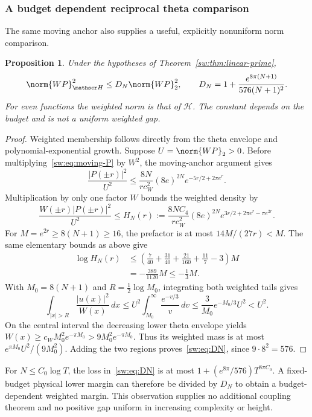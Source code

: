\documentclass[11pt,a4paper]{article}
\numberwithin{equation}{section}
\newtheorem{proposition}[theorem]{Proposition}
\theoremstyle{definition}\newtheorem{definition}[theorem]{Definition}
\theoremstyle{remark}\newtheorem{remark}[theorem]{Remark}
\begin{document}
\subsubsection{A budget dependent reciprocal theta comparison}
The same moving anchor also supplies a useful, explicitly nonuniform norm comparison.
\begin{proposition}\label{sw:prop:weighted-comparison}
Under the hypotheses of Theorem~\ref{sw:thm:linear-prime},
\begin{equation}\label{sw:eq:DN}
 \norm{WP}_{\mathscr H}^2\le D_N\norm{WP}_2^2,
 \qquad D_N=1+\frac{e^{8\pi(N+1)}}{576(N+1)^2}.
\end{equation}
For even functions the weighted norm is that of $\mathcal H$. The constant depends on the budget and is not a uniform weighted gap.
\end{proposition}
\begin{proof}
Weighted membership follows directly from the theta envelope and polynomial-exponential growth. Suppose $U=\norm{WP}_2>0$. Before multiplying~\eqref{sw:eq:moving-P} by $W^2$, the moving-anchor argument gives
\[
 \frac{|P(\pm r)|^2}{U^2}\le\frac{8N}{rc_W^2}(8e)^{2N}
               e^{-5r/2+2\pi e^r}.
\]
Multiplication by only one factor $W$ bounds the weighted density by
\begin{equation}\label{sw:eq:weighted-density}
 \frac{W(\pm r)|P(\pm r)|^2}{U^2}
 \le H_N(r):=\frac{8NC_4}{rc_W^2}(8e)^{2N}
                   e^{3r/2+2\pi e^r-\pi e^{2r}}.
\end{equation}
For $M=e^{2r}\ge8(N+1)\ge16$, the prefactor is at most
$14M/(27r)<M$. The same elementary bounds as above give
\begin{align*}
 \log H_N(r)
 &\le\left(\frac7{40}+\frac{31}{40}+\frac{21}{160}+\frac{11}{7}-3\right)M\\
 &=-\frac{389}{1120}M\le-\frac13M.
\end{align*}
With $M_0=8(N+1)$ and $R=\frac12\log M_0$, integrating both weighted tails gives
\[
 \int_{|x|>R}\frac{|u(x)|^2}{W(x)}\,dx
 \le U^2\int_{M_0}^\infty\frac{e^{-v/3}}v\,dv
 \le\frac3{M_0}e^{-M_0/3}U^2<U^2.
\]
On the central interval the decreasing lower theta envelope yields
$W(x)\ge c_WM_0^2e^{-\pi M_0}>9M_0^2e^{-\pi M_0}$.
Thus its weighted mass is at most $e^{\pi M_0}U^2/(9M_0^2)$. Adding the two regions proves~\eqref{sw:eq:DN}, since $9\cdot8^2=576$.
\end{proof}
For $N\le C_0\log T$, the loss in~\eqref{sw:eq:DN} is at most
$1+(e^{8\pi}/576)T^{8\pi C_0}$. A fixed-budget physical lower margin can therefore be divided by $D_N$ to obtain a budget-dependent weighted margin. This observation supplies no additional coupling theorem and no positive gap uniform in increasing complexity or height.
\end{document}
